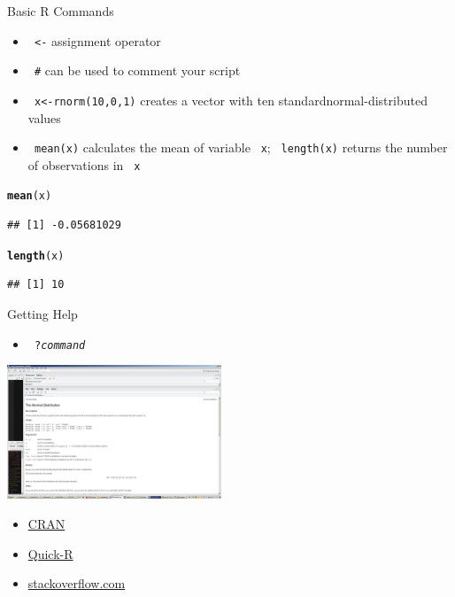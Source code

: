 \documentclass[11pt,german,hideothersubsections]{beamer}\usepackage[]{graphicx}\usepackage[]{color}
\makeatletter
\newcommand{\hlstd}[1]{\textcolor[rgb]{0.345,0.345,0.345}{#1}}%
\newcommand{\hlkwd}[1]{\textcolor[rgb]{0.737,0.353,0.396}{\textbf{#1}}}%
\newenvironment{kframe}{%
 \def\at@end@of@kframe{}%
 \ifinner\ifhmode%
  \def\at@end@of@kframe{\end{minipage}}%
  \begin{minipage}{\columnwidth}%
 \fi\fi%
 \def\FrameCommand##1{\hskip\@totalleftmargin \hskip-\fboxsep
 \colorbox{shadecolor}{##1}\hskip-\fboxsep
     \hskip-\linewidth \hskip-\@totalleftmargin \hskip\columnwidth}%
 \MakeFramed {\advance\hsize-\width
   \@totalleftmargin\z@ \linewidth\hsize
   \@setminipage}}%
 {\par\unskip\endMakeFramed%
 \at@end@of@kframe}
\newenvironment{knitrout}{}{} %
\newcommand{\R}[1]{{\tt \color{blue}  #1}}
\makeatother
\begin{document}
\begin{frame}[fragile]{Basic R Commands}
\begin{itemize}
\item \R{<-}  assignment operator
\item \R{\#} can be used to comment your script
\item \R{x<-rnorm(10,0,1)}  creates a vector with ten standardnormal-distributed values
\item \R{mean(x)} calculates the mean of variable \R{x}; \R{length(x)} returns the number of observations in \R{x}
\end{itemize}

\begin{knitrout}
\color{fgcolor}\begin{kframe}
\begin{alltt}
\hlkwd{mean}\hlstd{(x)}
\end{alltt}
\begin{verbatim}
## [1] -0.05681029
\end{verbatim}
\begin{alltt}
\hlkwd{length}\hlstd{(x)}
\end{alltt}
\begin{verbatim}
## [1] 10
\end{verbatim}
\end{kframe}
\end{knitrout}
\end{frame}
\begin{frame}[fragile]{Getting Help}
\begin{itemize}
\item \R{?\emph{command}}
\end{itemize}
\includegraphics[width=\textwidth, height=4cm]{../../../tutorial/graphs/rhlep.png}
\begin{itemize}
\item \href{https://cran.r-project.org}{CRAN}
\item \href{http://www.statmethods.net}{Quick-R}
\item \href{http://stackoverflow.com/questions/tagged/r}{stackoverflow.com}
\end{itemize}

\end{frame}
\end{document}
